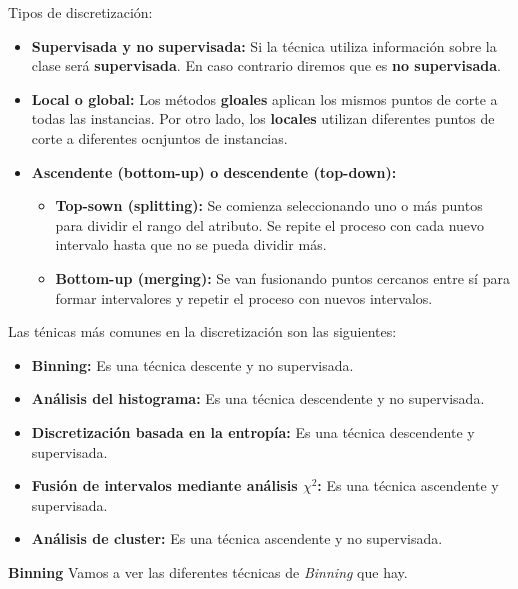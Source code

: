 \documentclass[12pt, letterpaper]{article}
\begin{document}
Tipos de discretización:
\begin{itemize}
    \item \textbf{Supervisada y no supervisada:} Si la técnica utiliza información sobre la clase será \textbf{supervisada}. En caso contrario diremos que es \textbf{no supervisada}.
    \item \textbf{Local o global:} Los métodos \textbf{gloales} aplican los mismos puntos de corte a todas las instancias. Por otro lado, los \textbf{locales} utilizan diferentes puntos de corte a diferentes ocnjuntos de instancias.
    \item \textbf{Ascendente (bottom-up) o descendente (top-down):}
    \begin{itemize}
        \item \textbf{Top-sown (splitting):} Se comienza seleccionando uno o más puntos para dividir el rango del atributo. Se repite el proceso con cada nuevo intervalo hasta que no se pueda dividir más.
        \item \textbf{Bottom-up (merging):} Se van fusionando puntos cercanos entre sí para formar intervalores y repetir el proceso con nuevos intervalos.
    \end{itemize}
\end{itemize}

Las ténicas más comunes en la discretización son las siguientes:
\begin{itemize}
    \item \textbf{Binning:} Es una técnica descente y no supervisada. 
    \item \textbf{Análisis del histograma:} Es una técnica descendente y no supervisada.
    \item \textbf{Discretización basada en la entropía:} Es una técnica descendente y supervisada.
    \item \textbf{Fusión de intervalos mediante análisis $\chi^2$:} Es una técnica ascendente y supervisada.
    \item \textbf{Análisis de cluster:} Es una técnica ascendente y no supervisada.
\end{itemize}

\vspace{1 em}
\textbf{Binning}
Vamos a ver las diferentes técnicas de \textit{Binning} que hay.
\end{document}
